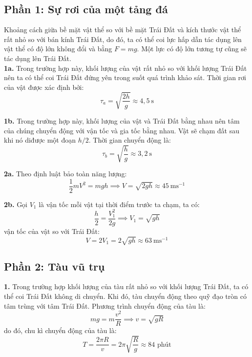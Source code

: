 
\subsection*{Phần 1: Sự rơi của một tảng đá}
\noindent Khoảng cách giữa bề mặt vật thể so với bề mặt Trái Đất và kích thước vật thể rất nhỏ so với bán kính Trái Đất, do đó, ta có thể coi lực hấp dẫn tác dụng lên vật thể có độ lớn không đổi và bằng $F=mg$. Một lực có độ lớn tương tự cũng sẽ tác dụng lên Trái Đất. \\

\noindent\textbf{1a.} Trong trường hợp này, khối lượng của vật rất nhỏ so với khối lượng Trái Đất nên ta có thể coi Trái Đất đứng yên trong suốt quá trình khảo sát. Thời gian rơi của vật được xác định bởi:
\begin{equation*}
  \tau_{a}=\sqrt{\frac{2h}{g}}\approx 4,5 \SI{ }{\second}
\end{equation*}

\noindent\textbf{1b.} Trong trường hợp này, khối lượng của vật và Trái Đất bằng nhau nên tâm của chúng chuyển động với vận tốc và gia tốc bằng nhau. Vật sẽ chạm đất sau khi nó diđược một đoạn $h/2$. Thời gian chuyển động là:
\begin{equation*}
  \tau_{b}=\sqrt{\frac{h}{g}}\approx 3,2 \SI{}{\second}
\end{equation*}

\noindent\textbf{2a.} Theo định luật bảo toàn năng lượng:
\begin{equation*}
  \frac{1}{2}mV^{2}=mgh\implies V=\sqrt{2gh}\approx \SI{45}{\metre\second^{-1}}
\end{equation*}

\noindent\textbf{2b.} Gọi $V_{1}$ là vận tốc mỗi vật tại thời điểm trước ta chạm, ta có:
\begin{equation*}
  \frac{h}{2}=\frac{V_{1}^{2}}{2g}\implies V_{1}=\sqrt{gh}
\end{equation*}
vận tốc của vật so với Trái Đất:
\begin{equation*}
  V=2V_{1}=2\sqrt{gh}\approx\SI{63}{\metre\second^{-1}}
\end{equation*}

\subsection*{Phần 2: Tàu vũ trụ}
\noindent\textbf{1.} Trong trường hợp khối lượng của tàu rất nhỏ so với khối lượng Trái Đất, ta có thể coi Trái Đất không di chuyển. Khi đó, tàu chuyển động theo quỹ đạo tròn có tâm trùng với tâm Trái Đất. Phương trình chuyển động của tàu là:
\begin{equation*}
  mg=m\frac{v^{2}}{R}\implies v=\sqrt{gR}
\end{equation*}
do đó, chu kì chuyển động của tàu là:
\begin{equation*}
  T=\frac{2\pi R}{v}=2\pi\sqrt{\frac{R}{g}}\approx 84 \text{ phút}
\end{equation*}

